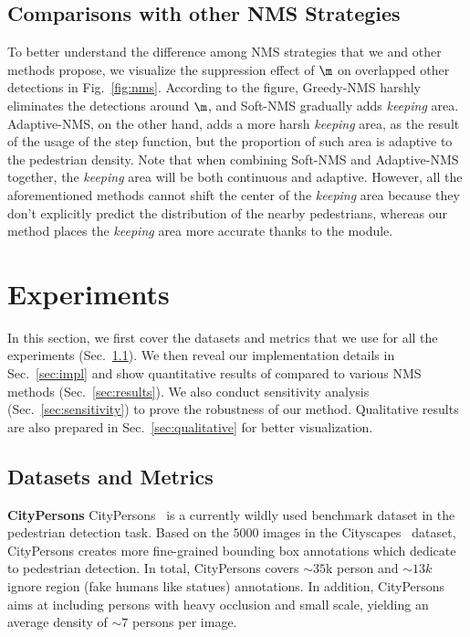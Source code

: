 \documentclass[sigconf]{acmart}
\begin{document}
\subsection{Comparisons with other NMS Strategies}
\label{sec:compare}
To better understand the difference among NMS strategies that we and other methods propose, we visualize the suppression effect of $\m$ on overlapped other detections in Fig.~\ref{fig:nms}. According to the figure, Greedy-NMS harshly eliminates the detections around $\m$, and Soft-NMS gradually adds \textit{keeping} area. Adaptive-NMS, on the other hand, adds a more harsh \textit{keeping} area, as the result of the usage of the step function, but the proportion of such area is adaptive to the pedestrian density. Note that when combining Soft-NMS and Adaptive-NMS together, the \textit{keeping} area will be both continuous and adaptive. However, all the aforementioned methods cannot shift the center of the \textit{keeping} area because they don't explicitly predict the distribution of the nearby pedestrians, whereas our method places the \textit{keeping} area more accurate thanks to the \heatmapnameshort{} module.

\section{Experiments}
\label{sec:experiments}
In this section, we first cover the datasets and metrics that we use for all the experiments (Sec.~\ref{sec:data}). We then reveal our implementation details in Sec.~\ref{sec:impl} and show quantitative results of \nmsname{} compared to various NMS methods (Sec.~\ref{sec:results}). We also conduct sensitivity analysis (Sec.~\ref{sec:sensitivity}) to prove the robustness of our method. Qualitative results are also prepared in Sec.~\ref{sec:qualitative} for better visualization.

\subsection{Datasets and Metrics}
\label{sec:data}
\textbf{CityPersons} CityPersons~\cite{citypersons} is a currently wildly used benchmark dataset in the pedestrian detection task. Based on the $5000$ images in the Cityscapes~\cite{cityscapes} dataset, CityPersons creates more fine-grained bounding box annotations which dedicate to pedestrian detection. In total, CityPersons covers $\sim35$k person and $\sim13k$ ignore region (fake humans like statues) annotations. In addition, CityPersons aims at including persons with heavy occlusion and small scale, yielding an average density of $\sim7$ persons per image. 
\end{document}
